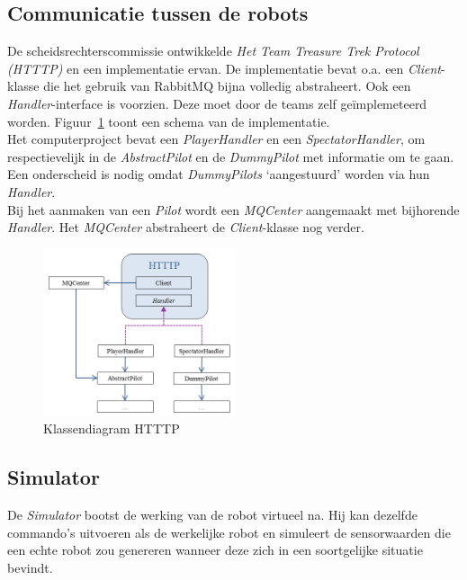\documentclass[tt3]{penoverslag}
\begin{document}
\subsection{Communicatie tussen de robots}
\label{ssec:RabbMQ}
De scheidsrechterscommissie ontwikkelde \textit{Het Team Treasure Trek Protocol (HTTTP)} en een implementatie ervan. De implementatie bevat o.a. een \textit{Client}-klasse die het gebruik van RabbitMQ bijna volledig abstraheert. Ook een \textit{Handler}-interface is voorzien. Deze moet door de teams zelf ge\"implemeteerd worden. Figuur~\ref{fig:klasHTTTP} toont een schema van de implementatie.\\

Het computerproject bevat een \textit{PlayerHandler} en een \textit{SpectatorHandler}, om respectievelijk in de \textit{AbstractPilot} en de \textit{DummyPilot} met informatie om te gaan. Een onderscheid is nodig omdat \textit{DummyPilots} `aangestuurd' worden via hun \textit{Handler}.\\

Bij het aanmaken van een \textit{Pilot} wordt een \textit{MQCenter} aangemaakt met bijhorende \textit{Handler}. Het \textit{MQCenter} abstraheert de \textit{Client}-klasse nog verder.

\begin{figure}[h]
\centering
	\includegraphics[width=0.5\textwidth]{KlasHTTTP}
\caption{Klassendiagram HTTTP}
\label{fig:klasHTTTP}
\end{figure}


\subsection{Simulator} 
\label{ssec:Sim}
De \textit{Simulator} bootst de werking van de robot virtueel na. Hij kan dezelfde commando's uitvoeren als de werkelijke robot en simuleert de sensorwaarden die een echte robot zou genereren wanneer deze zich in een soortgelijke situatie bevindt.\\
\end{document}
